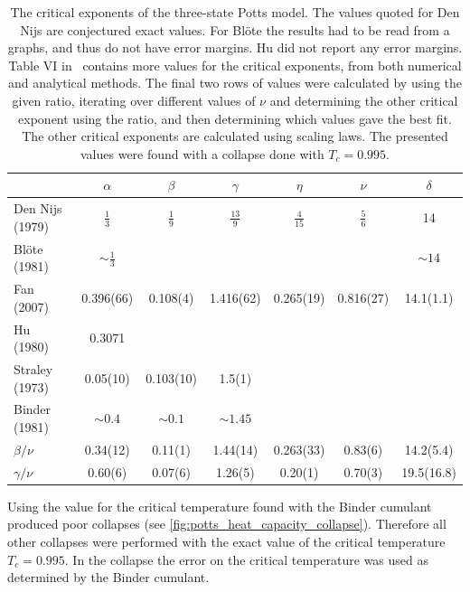 \documentclass[11pt, a4paper]{report} %
\begin{document}
\begin{table}[htb]
	\begin{adjustbox}{center}
		\centering
		\renewcommand{\arraystretch}{1.5}
		\begin{tabular}{l | c c c c c c}
			\hline
			& \(\alpha\) & \(\beta\) & \(\gamma\) & \(\eta\) & \(\nu\) & \(\delta\) \\\hline
			Den Nijs (1979)~\cite{nijs:1979,baxter:1989} & \(\frac{1}{3}\) & \(\frac{1}{9}\) & \(\frac{13}{9}\) & \(\frac{4}{15}\) & \(\frac{5}{6}\) & 14 \\
			Blöte (1981)~\cite{blote:1981} & \(\sim\frac{1}{3}\) & & & & & \(\sim14\)\\
			Fan (2007)~\cite{fan:2007} & 0.396(66) & 0.108(4) & 1.416(62) & 0.265(19) & 0.816(27) & 14.1(1.1) \\
			Hu (1980)~\cite{hu:1980} & 0.3071 & \\
			Straley (1973)~\cite{straley:1973} & 0.05(10)& 0.103(10) & 1.5(1)\\
			Binder (1981)~\cite{binder:1981a} & \(\sim0.4\) & \(\sim0.1\) & \(\sim1.45\)\\
			\(\beta/\nu\) & 0.34(12) & 0.11(1) & 1.44(14) & 0.263(33) & 0.83(6) & 14.2(5.4)\\
			\(\gamma/\nu\) & 0.60(6) & 0.07(6) & 1.26(5) & 0.20(1) & 0.70(3) & 19.5(16.8)\\\hline
		\end{tabular}
	\end{adjustbox}
	\caption{The critical exponents of the three-state Potts model. The values quoted for Den Nijs are conjectured exact values. For Blöte the results had to be read from a graphs, and thus do not have error margins. Hu did not report any error margins.
	Table VI in~\cite{wu:1982} contains more values for the critical exponents, from both numerical and analytical methods.
	The final two rows of values were calculated by using the given ratio, iterating over different values of \(\nu\) and determining the other critical exponent using the ratio, and then determining which values gave the best fit. The other critical exponents are calculated using scaling laws. The presented values were found with a collapse done with \(T_c=0.995\).}
	\label{tab:potts_critical_exponents}
\end{table}

Using the  value for the critical temperature found with the Binder cumulant produced poor collapses (see \cref{fig:potts_heat_capacity_collapse}).
Therefore all other collapses were performed with the exact value of the critical temperature \(T_c=0.995\).
In the collapse the error on the critical temperature was used as determined by the Binder cumulant.
\end{document}
